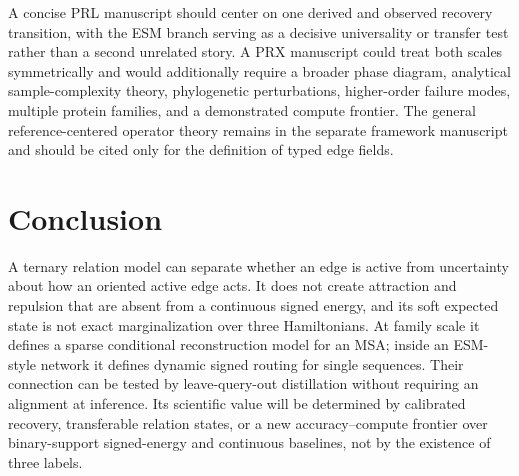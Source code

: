 \documentclass[10pt,twocolumn]{article}
\newcommand{\1}{\mathbf 1}
\theoremstyle{remark}
\begin{document}
A concise PRL manuscript should center on one derived and observed recovery transition, with the
ESM branch serving as a decisive universality or transfer test rather than a second unrelated
story.  A PRX manuscript could treat both scales symmetrically and would additionally require a
broader phase diagram, analytical sample-complexity theory, phylogenetic perturbations,
higher-order failure modes, multiple protein families, and a demonstrated compute frontier.  The
general reference-centered operator theory remains in the separate framework manuscript and should
be cited only for the definition of typed edge fields.

\section{Conclusion}

A ternary relation model can separate whether an edge is active from uncertainty about how an
oriented active edge acts.  It does not create attraction and repulsion that are absent from a
continuous signed energy, and its soft expected state is not exact marginalization over three
Hamiltonians.  At family scale it defines a sparse conditional reconstruction model for an MSA;
inside an ESM-style network it defines dynamic signed routing for single sequences.  Their
connection can be tested by leave-query-out distillation without requiring an alignment at
inference.  Its scientific value will be determined by calibrated recovery, transferable relation
states, or a new accuracy--compute frontier over binary-support signed-energy and continuous
baselines, not by the existence of three labels.
\end{document}
